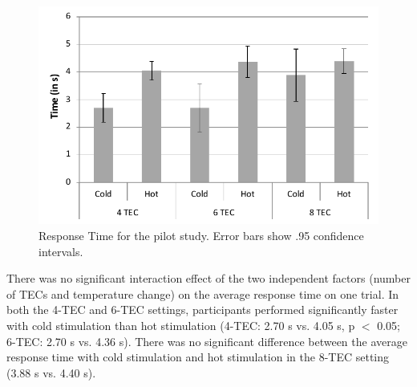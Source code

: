 \documentclass[preprint,12pt]{elsarticle}
\begin{document}
\begin{figure}[tp]
  \centering
  \includegraphics[width=0.7\columnwidth]{img/fig8.pdf}
  \caption{Response Time for the pilot study. Error bars show .95 confidence intervals.}
  \label{fig:8}
\end{figure}

There was no significant interaction effect of the two independent factors (number of TECs and temperature change) on the average response time on one trial. In both the 4-TEC and 6-TEC settings, participants performed significantly faster with cold stimulation than hot stimulation (4-TEC: 2.70 s vs. 4.05 s, p $<$ 0.05; 6-TEC: 2.70 s vs. 4.36 s). There was no significant difference between the average response time with cold stimulation and hot stimulation in the 8-TEC setting (3.88 s vs. 4.40 s).
\end{document}
